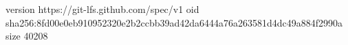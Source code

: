 version https://git-lfs.github.com/spec/v1
oid sha256:8fd00e0eb910952320e2b2ccbb39ad42da6444a76a263581d4dc49a884f2990a
size 40208
